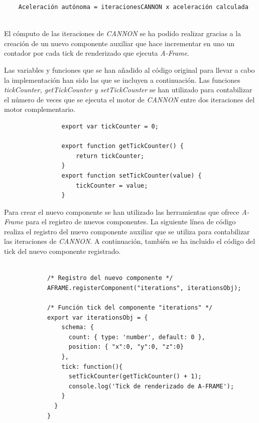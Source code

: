 \small {
\begin{verbatim}
    Aceleración autónoma = iteracionesCANNON x aceleración calculada
    
\end{verbatim}
}

\normalsize
El cómputo de las iteraciones de \textit{CANNON} se ha podido realizar gracias a la creación de un nuevo componente auxiliar que hace incrementar en uno un contador por cada tick de renderizado que ejecuta \textit{A-Frame}. \newline


Las variables y funciones que se han añadido al código original para llevar a cabo la implementación han sido las que se incluyen a continuación. Las funciones \textit{tickCounter, getTickCounter y setTickCounter} se han utilizado para contabilizar el número de veces que se ejecuta el motor de \textit{CANNON} entre dos iteraciones del motor complementario.

\small {
\begin{verbatim}
                export var tickCounter = 0;
                
                export function getTickCounter() {
                    return tickCounter;
                }
                export function setTickCounter(value) {
                    tickCounter = value;
                }
\end{verbatim}
}

\normalsize
Para crear el nuevo componente se han utilizado las herramientas que ofrece \textit{A-Frame} para el registro de nuevos componentes. La siguiente línea de código realiza el registro del nuevo componente auxiliar que se utiliza para contabilizar las iteraciones de \textit{CANNON}. A continuación, también se ha incluido el código del tick del nuevo componente registrado.

\small {
\begin{verbatim}

            /* Registro del nuevo componente */
            AFRAME.registerComponent("iterations", iterationsObj);
            
            /* Función tick del componente "iterations" */
            export var iterationsObj = {
                schema: {
                  count: { type: 'number', default: 0 },
                  position: { "x":0, "y":0, "z":0}
                },
                tick: function(){
                  setTickCounter(getTickCounter() + 1);
                  console.log('Tick de renderizado de A-FRAME');
                }
              }
            }
\end{verbatim}
}

